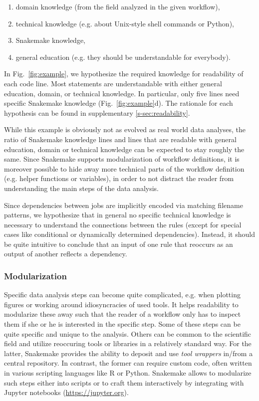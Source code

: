 \documentclass[parskip=half]{scrartcl}
\let\plainurl\url
\renewcommand{\url}[1]{\protect\plainurl{#1}}
\begin{document}
\begin{enumerate}
	\item domain knowledge (from the field analyzed in the given workflow),
	\item technical knowledge (e.g. about Unix-style shell commands or Python),
	\item Snakemake knowledge,
	\item general education (e.g. they should be understandable for everybody).
\end{enumerate}

In Fig.~{\ref{fig:example}}, we hypothesize the required knowledge for readability of each code line.
Most statements are understandable with either general education, domain, or technical knowledge.
In particular, only five lines need specific Snakemake knowledge (Fig.~{\ref{fig:example}}d).
The rationale for each hypothesis can be found in supplementary \autoref{s-sec:readability}.

While this example is obviously not as evolved as real world data analyses, the ratio of Snakemake knowledge lines and lines that are readable with general education, domain or technical knowledge can be expected to stay roughly the same.
Since Snakemake supports modularization of workflow definitions, it is moreover possible to hide away more technical parts of the workflow definition (e.g. helper functions or variables), in order to not distract the reader from understanding the main steps of the data analysis.

Since dependencies between jobs are implicitly encoded via matching filename patterns, we hypothesize that in general no specific technical knowledge is necessary to understand the connections between the rules (except for special cases like conditional or dynamically determined dependencies).
Instead, it should be quite intuitive to conclude that an input of one rule that reoccurs as an output of another reflects a dependency.

\subsubsection{Modularization}\label{sec:modularization}

Specific data analysis steps can become quite complicated, e.g. when plotting figures or working around idiosyncracies of used tools.
It helps readability to modularize these away such that the reader of a workflow only has to inspect them if she or he is interested in the specific step.
Some of these steps can be quite specific and unique to the analysis.
Others can be common to the scientific field and utilize reoccuring tools or libraries in a relatively standard way.
For the latter, Snakemake provides the ability to deposit and use \emph{tool wrappers} in/from a central repository.
In contrast, the former can require custom code, often written in various scripting languages like R or Python.
Snakemake allows to modularize such steps either into scripts or to craft them interactively by integrating with Jupyter notebooks (\url{https://jupyter.org}).
\end{document}
